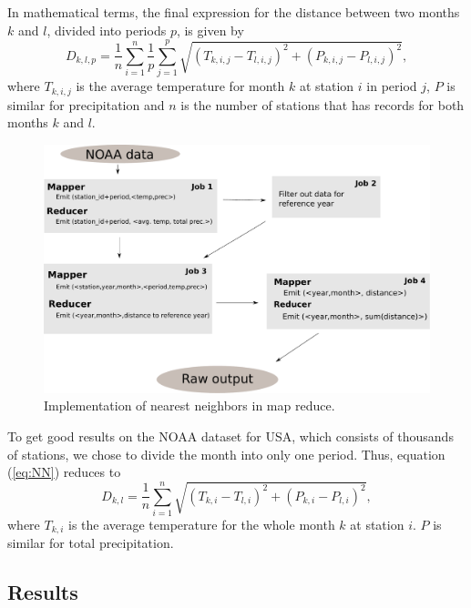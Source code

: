 In mathematical terms, the final expression for the distance between two months
$k$ and $l$, divided into periods $p$, is given by
\begin{equation}
	\label{eq:NN}
	D_{k,l,p} = \frac{1}{n}\sum_{i=1}^{n}{\frac{1}{p}\sum_{j=1}^{p}{
		\sqrt{
			(T_{k,i,j} - T_{l,i,j})^2 + 
			(P_{k,i,j} - P_{l,i,j})^2
		}}},
\end{equation}
where $T_{k,i,j}$ is the average temperature for month $k$ at station $i$ in 
period $j$, $P$ is similar for precipitation and $n$ is the number of stations
that has records for both months $k$ and $l$.

\begin{figure}[tb]
 	\begin{center}
 		\includegraphics[width=12cm]{figures/NNmapReduce.pdf}
 	\end{center}
 	\caption{Implementation of nearest neighbors in map reduce.}
 	\label{fig:NNmapReduce}
 \end{figure} 

To get good results on the NOAA dataset for USA, which consists of thousands 
of stations, we chose to divide the month into only one period. Thus, equation
(\ref{eq:NN}) reduces to
\begin{equation}
	\label{eq:NN_usa}
	D_{k,l} = \frac{1}{n}\sum_{i=1}^{n}{
	\sqrt{
		(T_{k,i} - T_{l,i})^2 + 
		(P_{k,i} - P_{l,i})^2
	}},
\end{equation}
where $T_{k,i}$ is the average temperature for the whole month $k$ at station $
i$. $P$ is similar for total precipitation. 


\subsection{Results} %

